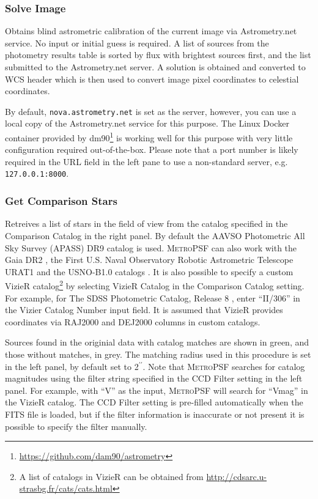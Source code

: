 \documentclass{article}
\newcommand\arcsec{\mbox{$^{\prime\prime}$}}%
\begin{document}
\subsubsection{Solve Image}
Obtains blind astrometric calibration of the current image via Astrometry.net service. No input or initial guess is required. A list of sources from the photometry results table is sorted by flux with brightest sources first, and the list submitted to the Astrometry.net server. A solution is obtained and converted to WCS header which is then used to convert image pixel coordinates to celestial coordinates. 

By default, \texttt{nova.astrometry.net} is set as the server, however, you can use a local copy of the Astrometry.net service for this purpose.  The Linux Docker container provided by dm90\footnote{\url{https://github.com/dam90/astrometry}} is working well for this purpose with very little configuration required out-of-the-box. Please note that a port number is likely required in the URL field in the left pane to use a non-standard server, e.g. \texttt{127.0.0.1:8000}.

\subsubsection{Get Comparison Stars}
Retreives a list of stars in the field of view from the catalog specified in the Comparison Catalog in the right panel. By default the AAVSO Photometric All Sky Survey (APASS) DR9 catalog \citep{2015AAS...22533616H} is used. \textsc{MetroPSF} can also work with the Gaia DR2 \citep{2018A&A...616A...1G}, the First U.S. Naval Observatory Robotic Astrometric Telescope URAT1 \citep{2015AJ....150..101Z} and the USNO-B1.0 catalogs \citep{2003AJ....125..984M}. It is also possible to specify a custom VizieR catalog\footnote{A list of catalogs in VizieR can be obtained from \url{http://cdsarc.u-strasbg.fr/cats/cats.html}} by selecting VizieR Catalog in the Comparison Catalog setting. For example, for The SDSS Photometric Catalog, Release 8 \citep{2011yCat.2306....0A}, enter ``II/306'' in the Vizier Catalog Number input field. It is assumed that VizieR provides coordinates via RAJ2000 and DEJ2000 columns in custom catalogs.

Sources found in the originial data with catalog matches are shown in green, and those without matches, in grey. The matching radius used in this procedure is set in the left panel, by default set to 2\arcsec. Note that \textsc{MetroPSF} searches for catalog magnitudes using the filter string specified in the CCD Filter setting in the left panel. For example, with ``V'' as the input, \textsc{MetroPSF} will search for ``Vmag'' in the VizieR catalog. The CCD Filter setting is pre-filled automatically when the FITS file is loaded, but if the filter information is inaccurate or not present it is possible to specify the filter manually.
\end{document}
